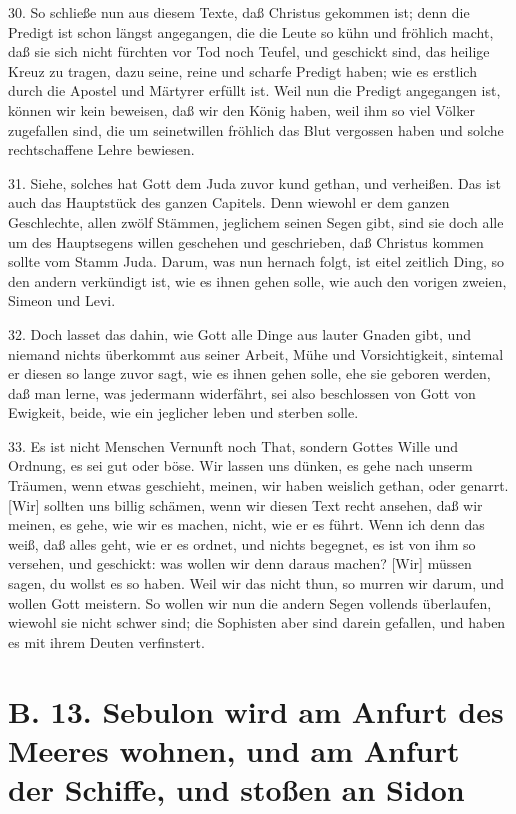 30. So schließe nun aus diesem Texte, daß Christus gekommen ist; denn die Predigt ist schon längst angegangen, die die Leute so kühn und fröhlich macht, daß sie sich nicht fürchten vor Tod noch Teufel, und geschickt sind, das heilige Kreuz zu tragen, dazu seine, reine und scharfe Predigt haben; wie es erstlich durch die Apostel und Märtyrer erfüllt ist. Weil nun die Predigt angegangen ist, können wir kein beweisen, daß wir den König haben, weil ihm so viel Völker zugefallen sind, die um seinetwillen fröhlich das Blut vergossen haben und solche rechtschaffene Lehre bewiesen.

31. Siehe, solches hat Gott dem Juda zuvor kund gethan, und verheißen. Das ist auch das Hauptstück des ganzen Capitels. Denn wiewohl er dem ganzen Geschlechte, allen zwölf Stämmen, jeglichem seinen Segen gibt, sind sie doch alle um des Hauptsegens willen geschehen und geschrieben, daß Christus kommen sollte vom Stamm Juda. Darum, was nun hernach folgt, ist eitel zeitlich Ding, so den andern verkündigt ist, wie es ihnen gehen solle, wie auch den vorigen zweien, Simeon und Levi.

32. Doch lasset das dahin, wie Gott alle Dinge aus lauter Gnaden gibt, und niemand nichts überkommt aus seiner Arbeit, Mühe und Vorsichtigkeit, sintemal er diesen so lange zuvor sagt, wie es ihnen gehen solle, ehe sie geboren werden, daß man lerne, was jedermann widerfährt, sei also beschlossen von Gott von Ewigkeit, beide, wie ein jeglicher leben und sterben solle.

33. Es ist nicht Menschen Vernunft noch That, sondern Gottes Wille und Ordnung, es sei gut oder böse. Wir lassen uns dünken, es gehe nach unserm Träumen, wenn etwas geschieht, meinen, wir haben weislich gethan, oder genarrt. [Wir] sollten uns billig schämen, wenn wir diesen Text recht ansehen, daß wir meinen, es gehe, wie wir es machen, nicht, wie er es führt. Wenn ich denn das weiß, daß alles geht, wie er es ordnet, und nichts begegnet, es ist von ihm so versehen, und geschickt: was wollen wir denn daraus machen? [Wir] müssen sagen, du wollst es so haben. Weil wir das nicht thun, so murren wir darum, und wollen Gott meistern. So wollen wir nun die andern Segen vollends überlaufen, wiewohl sie nicht schwer sind; die Sophisten aber sind darein gefallen, und haben es mit ihrem Deuten verfinstert.

\section[B. 13. Sebulon wird am Anfurt des Meeres]{B. 13. Sebulon wird am Anfurt des Meeres wohnen, und am Anfurt der Schiffe, und stoßen an Sidon}

